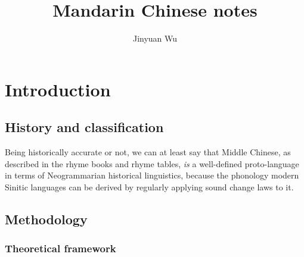 \documentclass[UTF8, a4paper, oneside, scheme=plain, 12pt]{ctexrep}
\title{Mandarin Chinese notes}
\author{Jinyuan Wu}
\begin{document}
\automath

\maketitle

\chapter{Introduction}

\section{History and classification}

Being historically accurate or not, we can at least say that Middle Chinese, as described in the rhyme books and rhyme tables,
\emph{is} a well-defined proto-language in terms of Neogrammarian historical linguistics,
because the phonology modern Sinitic languages can be derived by regularly applying sound change laws to it.

\section{Methodology}

\subsection{Theoretical framework}
\end{document}
